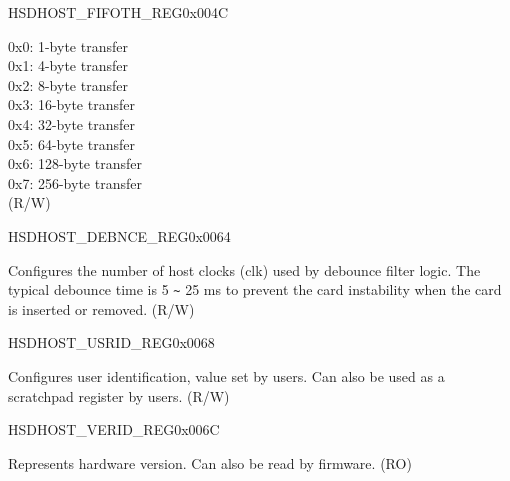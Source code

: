 \begin{register}{H}{SDHOST\_FIFOTH\_REG}{0x004C}
\begin{regdesc}
\begin{reglist}
0x0: 1-byte transfer\\
0x1: 4-byte transfer\\
0x2: 8-byte transfer\\
0x3: 16-byte transfer\\
0x4: 32-byte transfer\\
0x5: 64-byte transfer\\
0x6: 128-byte transfer\\
0x7: 256-byte transfer\\ (R/W)
\end{reglist}\end{regdesc}
\end{register}


\begin{register}{H}{SDHOST\_DEBNCE\_REG}{0x0064}\label{regdesc:SDHOSTDEBNCEREG}
%
%
\regnewline%
\begin{regdesc}\begin{reglist}
\label{fielddesc:SDHOSTDEBOUNCECOUNT}\item [SDHOST\_DEBOUNCE\_COUNT] Configures the number of host clocks (clk) used by debounce filter logic. The typical debounce time is 5 \verb+~+ 25 ms to prevent the card instability when the card is inserted or removed. (R/W)
\end{reglist}\end{regdesc}
\end{register}


\begin{register}{H}{SDHOST\_USRID\_REG}{0x0068}\label{regdesc:SDHOSTUSRIDREG}
%
\regnewline%
\begin{regdesc}\begin{reglist}
\label{fielddesc:SDHOSTUSRIDREG}\item [SDHOST\_USRID\_REG] Configures user identification, value set by users. Can also be used as a scratchpad register by users. (R/W)
\end{reglist}\end{regdesc}
\end{register}


\begin{register}{H}{SDHOST\_VERID\_REG}{0x{}006C}\label{regdesc:VERIDREG}
%
\regnewline%
\begin{regdesc}\begin{reglist}
\item [SDHOST\_VERSIONID\_REG] Represents hardware version. Can also be read by firmware. (RO)
\end{reglist}\end{regdesc}
\end{register}


